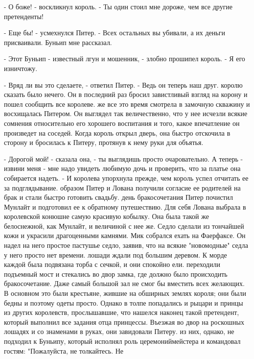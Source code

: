 \par- О боже! - воскликнул король. - Ты один стоил мне дороже, чем все 
другие претенденты!
\par- Еще бы! - усмехнулся Питер. - Всех остальных вы убивали, а их 
деньги присваивали. Буньип мне рассказал.
\par- Этот Буньип - известный лгун и мошенник, - злобно прошипел 
король. - Я его изничтожу.
\par- Вряд ли вы это сделаете, - ответил Питер. - Ведь он теперь наш 
друг.
 королю сказать было нечего. Он в последний раз бросил 
завистливый взгляд на корону и пошел сообщить все королеве.
 же все это время смотрела в замочную скважину и восхищалась 
Питером. Он выглядел так величественно, что у нее исчезли всякие 
сомнения относительно его хорошего воспитания и того, какое 
впечатление он произведет на соседей. Когда король открыл дверь, она 
быстро отскочила в сторону и бросилась к Питеру, протянув к нему руки 
для объятья.
\par- Дорогой мой! - сказала она, - ты выглядишь просто очаровательно. 
А теперь - извини меня - мне надо увидеть любимую дочь и проверить, 
что за платье она собирается надеть. - И королева упорхнула прежде, 
чем король успел отчитать ее за подглядывание.
 образом Питер и Лована получили согласие ее родителей на 
брак и стали быстро готовить свадьбу.
 день бракосочетания Питер почистил Мунлайт и подготовил ее к 
обратному путешествию. Для себя Лована выбрала в королевской конюшне 
самую красивую кобылку. Она была такой же белоснежной, как Мунлайт, и 
величиной с нее же. Седло сделали из тончайшей кожи и украсили 
драгоценными камнями.
 Мик собрался ехать на Фаерфаксе. Он надел на него простое 
пастушье седло, заявив, что на всякие "новомодные" седла у него просто 
нет времени.
 лошади ждали под большим деревом. К морде каждой была 
подвязана торба с сечкой, и они спокойно ели.
 переходили подъемный мост и стекались во двор замка, где 
должно было происходить бракосочетание. Даже самый большой зал не смог 
бы вместить всех желающих. В основном это были крестьяне, жившие на 
обширных землях короля; они были бедны и поэтому одеты просто. Однако 
в толпе попадались и рыцари и принцы из других королевств, 
прослышавшие, что нашелся наконец такой претендент, который выполнил 
все задания отца принцессы. Въезжая во двор на роскошных лошадях и со 
знаменами в руках, они завидовали Питеру.
 из них, однако, не подходил к Буньипу, который исполнял роль 
церемониймейстера и командовал гостям: "Пожалуйста, не толкайтесь. Не 
